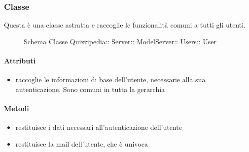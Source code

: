 \subsubsection{Classe }
Questa è una classe astratta e raccoglie le funzionalità comuni a tutti gli utenti.
\begin{figure}[H]
\centering
\noindent{}
\caption[Schema Classe User]{Schema Classe Quizzipedia:: Server:: ModelServer:: Users:: User}
\end{figure}
\paragraph{Attributi}
\begin{itemize}
\item {}
\newline
raccoglie le informazioni di base dell'utente, necessarie alla sua autenticazione. Sono comuni in tutta la gerarchia
\end{itemize}
\paragraph{Metodi}
\begin{itemize}
\item {}
\newline
restituisce i dati necessari all'autenticazione dell'utente
\newline
\item {}
\newline
restituisce la mail dell'utente, che è univoca
\newline
\end{itemize}
